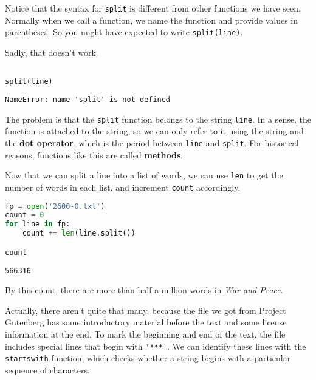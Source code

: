 Notice that the syntax for \passthrough{\lstinline!split!} is different
from other functions we have seen. Normally when we call a function, we
name the function and provide values in parentheses. So you might have
expected to write \passthrough{\lstinline!split(line)!}.

\pagebreak

Sadly, that doesn't work.

\begin{lstlisting}[language=Python,style=source]
%%expect NameError

split(line)
\end{lstlisting}

\begin{lstlisting}[style=output]
NameError: name 'split' is not defined
\end{lstlisting}

The problem is that the \passthrough{\lstinline!split!} function belongs
to the string \passthrough{\lstinline!line!}. In a sense, the function
is attached to the string, so we can only refer to it using the string
and the \textbf{dot operator}, which is the period between
\passthrough{\lstinline!line!} and \passthrough{\lstinline!split!}. For
historical reasons, functions like this are called \textbf{methods}.

Now that we can split a line into a list of words, we can use
\passthrough{\lstinline!len!} to get the number of words in each list,
and increment \passthrough{\lstinline!count!} accordingly.

\begin{lstlisting}[language=Python,style=source]
fp = open('2600-0.txt')
count = 0
for line in fp:
    count += len(line.split())

count
\end{lstlisting}

\begin{lstlisting}[style=output]
566316
\end{lstlisting}

By this count, there are more than half a million words in \emph{War and
Peace}.

Actually, there aren't quite that many, because the file we got from
Project Gutenberg has some introductory material before the text and
some license information at the end. To mark the beginning and end of
the text, the file includes special lines that begin with
\passthrough{\lstinline!'***'!}. We can identify these lines with the
\passthrough{\lstinline!startswith!} function, which checks whether a
string begins with a particular sequence of characters.

